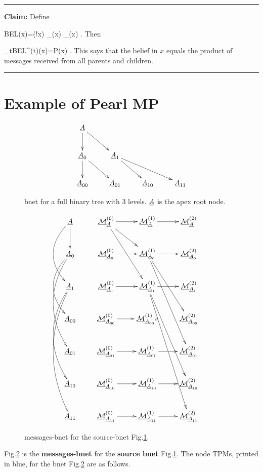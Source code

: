 \hrule\noindent
{\bf Claim:} Define

\beq
BEL(x)=\caln(!x)
\lam_{\rcond\rvx}(x)
\pi_{\rvx\lcond}(x)
\;.\eeq
Then

\beq
\lim_{t\rarrow \infty}BEL^{(t)}(x)=P(x)
\;.
\eeq
This  says that
the belief in $x$
equals the product 
of messages received from all
parents and children.


\hrule
\section*{Example of Pearl MP}

\begin{figure}[h!]
\centering
$$\xymatrix{
\rvA\ar[d]\ar[dr]
\\
\rvA_{0}\ar[d]\ar[dr]
&\rvA_{1}\ar[dr]\ar[drr]
\\
\rvA_{00}
&\rvA_{01}
&\rvA_{10}
&\rvA_{11}
}$$
\caption{bnet for a full binary 
tree with 3 levels. ${\underline{A}}$ is
the apex root node.}
\label{fig-full3-tree}
\end{figure}

\begin{figure}[h!]
\centering
$$\xymatrix{
\rvA\ar[d]\ar@/_2pc/[dd]
&\ucalm_\rvA^{(0)}\ar[rd]\ar[rdd]
\ar[r]
&\ucalm_\rvA^{(1)}
\ar[r]
&\ucalm_{\rvA}^{(2)}
\\
\rvA_{0}\ar@/_2pc/[dd]\ar@/_2pc/[ddd]
&\ucalm_{\rvA_{0}}^{(0)}
\ar[r]
&\ucalm_{\rvA_{0}}^{(1)}
\ar[r]\ar[rddd]\ar[rdd]
&\ucalm_{\rvA_{0}}^{(2)}
\\
\rvA_{1}\ar@/_2pc/[ddd]\ar@/_2pc/[dddd]
&\ucalm_{\rvA_{1}}^{(0)}
\ar[r]
&\ucalm_{\rvA_{1}}^{(1)}
\ar[rddd]\ar[rdddd]
\ar[r]
&\ucalm_{\rvA_{1}}^{(2)}
\\
\rvA_{00}
&\ucalm_{\rvA_{00}}^{(0)}
\ar[r]
&\ucalm_{\rvA_{00}}^{(1)}
v
&\ucalm_{\rvA_{00}}^{(2)}
\\
\rvA_{01}
&\ucalm_{\rvA_{01}}^{(0)}
\ar[r]
&\ucalm_{\rvA_{01}}^{(1)}
\ar[r]
&\ucalm_{\rvA_{01}}^{(2)}
\\
\rvA_{10}
&\ucalm_{\rvA_{10}}^{(0)}
\ar[r]
&\ucalm_{\rvA_{10}}^{(1)}
\ar[r]
&\ucalm_{\rvA_{10}}^{(2)}
\\
\rvA_{11}
&\ucalm_{\rvA_{11}}^{(0)}
\ar[r]
&\ucalm_{\rvA_{11}}^{(1)}
\ar[r]
&\ucalm_{\rvA_{11}}^{(2)}
}$$
\caption{messages-bnet
for the source-bnet Fig.\ref{fig-full3-tree}.}
\label{fig-mp-bnet-for-tree}
\end{figure}
Fig.\ref{fig-mp-bnet-for-tree} 
is the {\bf messages-bnet}
 for the 
{\bf source bnet} Fig.\ref{fig-full3-tree}.
The node TPMs,
printed in blue,
for the bnet
Fig.\ref{fig-mp-bnet-for-tree}
are as follows.


